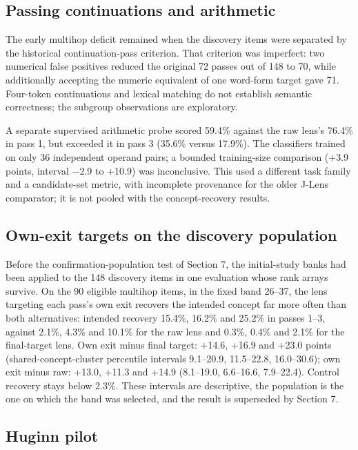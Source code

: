 \subsection{Passing continuations and
arithmetic}\label{passing-continuations-and-arithmetic}

The early multihop deficit remained when the discovery items were
separated by the historical continuation-pass criterion. That criterion
was imperfect: two numerical false positives reduced the original 72
passes out of 148 to 70, while additionally accepting the numeric
equivalent of one word-form target gave 71. Four-token continuations and
lexical matching do not establish semantic correctness; the subgroup
observations are exploratory.

A separate supervised arithmetic probe scored 59.4\% against the raw
lens's 76.4\% in pass 1, but exceeded it in pass 3 (35.6\% versus
17.9\%). The classifiers trained on only 36 independent operand pairs; a
bounded training-size comparison (+3.9 points, interval −2.9 to +10.9)
was inconclusive. This used a different task family and a candidate-set
metric, with incomplete provenance for the older J-Lens comparator; it
is not pooled with the concept-recovery results.

\subsection{Own-exit targets on the discovery
population}\label{own-exit-targets-on-the-discovery-population}

Before the confirmation-population test of Section 7, the initial-study
banks had been applied to the 148 discovery items in one evaluation
whose rank arrays survive. On the 90 eligible multihop items, in the
fixed band 26--37, the lens targeting each pass's own exit recovers the
intended concept far more often than both alternatives: intended
recovery 15.4\%, 16.2\% and 25.2\% in passes 1--3, against 2.1\%, 4.3\%
and 10.1\% for the raw lens and 0.3\%, 0.4\% and 2.1\% for the
final-target lens. Own exit minus final target: +14.6, +16.9 and +23.0
points (shared-concept-cluster percentile intervals 9.1--20.9,
11.5--22.8, 16.0--30.6); own exit minus raw: +13.0, +11.3 and +14.9
(8.1--19.0, 6.6--16.6, 7.9--22.4). Control recovery stays below 2.3\%.
These intervals are descriptive, the population is the one on which the
band was selected, and the result is superseded by Section 7.

\subsection{Huginn pilot}\label{huginn-pilot}

